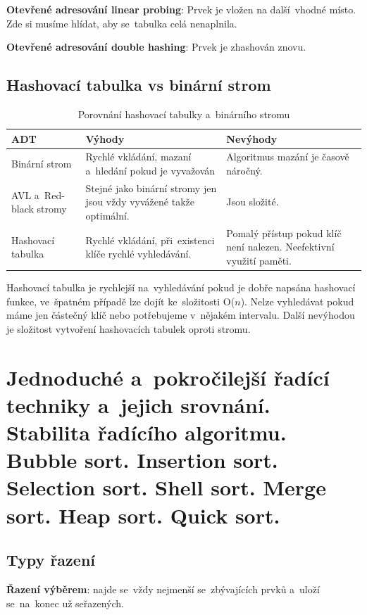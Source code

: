 \textbf{Otevřené adresování linear probing}: Prvek je vložen na další~vhodné místo. Zde si musíme hlídat, aby se~tabulka celá nenaplnila.

\textbf{Otevřené adresování double hashing}: Prvek je zhashován znovu.

\subsection{Hashovací tabulka vs binární strom}

\begin{table}[ht]
	\caption{Porovnání hashovací tabulky a~binárního stromu}
	\begin{tabularx}{\textwidth}{|l|X|X|}
	\hline
		  ADT & Výhody & Nevýhody \\\hline
		  Binární strom & Rychlé vkládání, mazaní a~hledání pokud je vyvažován & Algoritmus mazání je časově náročný. \\\hline
		  AVL a~Red-black stromy & Stejné jako binární stromy jen jsou vždy vyvážené takže optimální. & Jsou složité. \\\hline
		  Hashovací tabulka & Rychlé vkládání, při~existenci klíče rychlé vyhledávání. & Pomalý přístup pokud klíč není nalezen. Neefektivní využití paměti.\\\hline
	\end{tabularx}
\end{table}

Hashovací tabulka je rychlejší na~vyhledávání pokud je dobře napsána hashovací funkce, ve~špatném případě lze dojít ke~složitosti O($n$). Nelze vyhledávat pokud máme jen částečný klíč nebo potřebujeme v~nějakém intervalu. Další nevýhodou je složitost vytvoření hashovacích tabulek oproti stromu.

\clearpage
\section{Jednoduché a~pokročilejší řadící techniky a~jejich srovnání. Stabilita řadícího algoritmu. Bubble sort. Insertion sort. Selection sort. Shell sort. Merge sort. Heap sort. Quick sort.}

\subsection{Typy řazení}

\textbf{Řazení výběrem}: najde se~vždy nejmenší se~zbývajících prvků a~uloží se~na~konec už seřazených.

